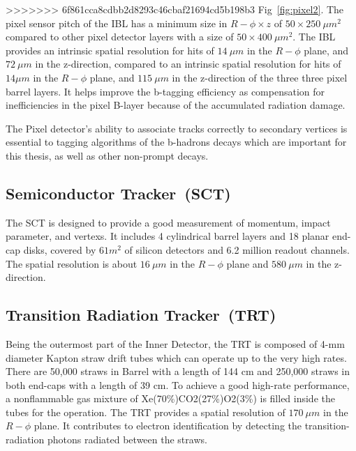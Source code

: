 >>>>>>> 6f861cca8cdbb2d8293c46cbaf21694cd5b198b3
Fig~\ref{fig:pixel2}. The pixel sensor pitch of the IBL has a minimum size in $R-\phi \times z$ of $50 \times 250~\mu m^2$ compared to other pixel detector layers with a size of $50 \times 400~\mu m^2$. 	 The IBL provides an intrinsic spatial resolution for hits of $14~\mu m$ in the $R-\phi$ plane, and
$72~\mu m$ in the z-direction, compared to an intrinsic spatial resolution for hits of $14\mu m$ in the $R-\phi$ plane, and $115~\mu m$ in the z-direction of the three three pixel barrel layers.
It helps improve the b-tagging efficiency as compensation for inefficiencies in the pixel B-layer because of the accumulated radiation damage.
\par The Pixel detector's ability to associate tracks correctly to secondary vertices is essential to tagging algorithms of the b-hadrons decays which are important for this thesis, as well as other non-prompt decays.
\subsection{Semiconductor Tracker~(SCT)}
The SCT \cite{AHMAD200798} is designed to provide a good measurement of momentum, impact parameter, and vertexs. It includes 4 cylindrical barrel layers and 18 planar end-cap disks, covered by $61 m^2$ of silicon detectors and 6.2 million readout channels. The spatial resolution is about $16~\mu m$ in the $R-\phi$ plane and $580~\mu m$ in the z-direction.

\subsection{Transition Radiation Tracker~(TRT)}

Being the outermost part of the Inner Detector, the TRT \cite{Abat:2008zza} is composed of 4-mm diameter Kapton straw drift tubes which can operate up to the very high rates. There are 50,000 straws in Barrel with a length of 144 cm and 250,000 straws in both end-caps with a length of 39 cm.
To achieve a good high-rate performance, a nonflammable gas mixture of Xe(70\%)CO2(27\%)O2(3\%) is filled inside the tubes for the operation. The TRT provides a spatial resolution of $170~\mu m$ in the $R-\phi$ plane. It contributes to electron identification by detecting the transition-radiation photons radiated between the straws. 

